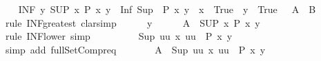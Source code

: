 \begin{isabellebody}
\isamarkupfalse%
\isanewline
\ \ \isamarkupfalse%
\ {\isachardoublequoteopen}{\isacharparenleft}{\kern0pt}INF\ y{\isachardot}{\kern0pt}\ SUP\ x{\isachardot}{\kern0pt}\ {\isacharparenleft}{\kern0pt}{\isacharparenleft}{\kern0pt}P\ x\ y{\isacharparenright}{\kern0pt}{\isacharparenright}{\kern0pt}{\isacharparenright}{\kern0pt}\ {\isasymle}\ Inf\ {\isacharparenleft}{\kern0pt}Sup\ {\isacharbackquote}{\kern0pt}\ {\isacharbraceleft}{\kern0pt}{\isacharbraceleft}{\kern0pt}P\ x\ y\ {\isacharbar}{\kern0pt}\ x\ {\isachardot}{\kern0pt}\ True{\isacharbraceright}{\kern0pt}\ {\isacharbar}{\kern0pt}\ y\ {\isachardot}{\kern0pt}\ True\ {\isacharbraceright}{\kern0pt}{\isacharparenright}{\kern0pt}{\isachardoublequoteclose}\ {\isacharparenleft}{\kern0pt}\ {\isachardoublequoteopen}{\isacharquery}{\kern0pt}A\ {\isasymle}\ {\isacharquery}{\kern0pt}B{\isachardoublequoteclose}{\isacharparenright}{\kern0pt}\isanewline
\ \ \isamarkupfalse%
\ {\isacharparenleft}{\kern0pt}rule\ INF{\isacharunderscore}{\kern0pt}greatest{\isacharcomma}{\kern0pt}\ clarsimp{\isacharparenright}{\kern0pt}\isanewline
\ \ \ \ \isamarkupfalse%
\ y\isanewline
\ \ \ \ \isamarkupfalse%
\ {\isachardoublequoteopen}{\isacharquery}{\kern0pt}A\ {\isasymle}\ {\isacharparenleft}{\kern0pt}SUP\ x{\isachardot}{\kern0pt}\ P\ x\ y{\isacharparenright}{\kern0pt}{\isachardoublequoteclose}\isanewline
\ \ \ \ \ \ \isamarkupfalse%
\ {\isacharparenleft}{\kern0pt}rule\ INF{\isacharunderscore}{\kern0pt}lower{\isacharcomma}{\kern0pt}\ simp{\isacharparenright}{\kern0pt}\isanewline
\ \ \ \ \isamarkupfalse%
\ \isamarkupfalse%
\ {\isachardoublequoteopen}{\isachardot}{\kern0pt}{\isachardot}{\kern0pt}{\isachardot}{\kern0pt}\ {\isasymle}\ Sup\ {\isacharbraceleft}{\kern0pt}uu{\isachardot}{\kern0pt}\ {\isasymexists}x{\isachardot}{\kern0pt}\ uu\ {\isacharequal}{\kern0pt}\ P\ x\ y{\isacharbraceright}{\kern0pt}{\isachardoublequoteclose}\isanewline
\ \ \ \ \ \ \isamarkupfalse%
\ {\isacharparenleft}{\kern0pt}simp\ add{\isacharcolon}{\kern0pt}\ full{\isacharunderscore}{\kern0pt}SetCompr{\isacharunderscore}{\kern0pt}eq{\isacharparenright}{\kern0pt}\isanewline
\ \ \ \ \isamarkupfalse%
\ \isamarkupfalse%
\ {\isachardoublequoteopen}{\isacharquery}{\kern0pt}A\ {\isasymle}\ Sup\ {\isacharbraceleft}{\kern0pt}uu{\isachardot}{\kern0pt}\ {\isasymexists}x{\isachardot}{\kern0pt}\ uu\ {\isacharequal}{\kern0pt}\ P\ x\ y{\isacharbraceright}{\kern0pt}{\isachardoublequoteclose}\isanewline

\end{isabellebody}
